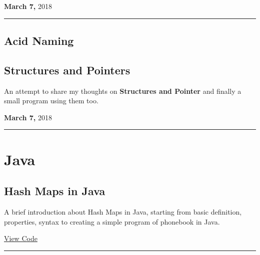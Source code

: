 \documentclass[11pt]{article}
\begin{document}
\textbf{March 7,} 2018

\noindent\rule{\textwidth}{0.5pt}

\subsection{Acid Naming}
\label{sec:org6a72935}

\subsection{Structures and Pointers}
\label{sec:org4056c38}
An attempt to share my thoughts on \textbf{Structures and Pointer} and finally a small
program using them too.

\textbf{March 7,} 2018

\noindent\rule{\textwidth}{0.5pt}
\section{Java}
\label{sec:org46338e2}
\subsection{Hash Maps in Java}
\label{sec:org58b3341}
A brief introduction about Hash Maps in Java, starting from basic definition,
properties, syntax to creating a simple program of phonebook in Java.

\href{https://github.com/imahajanshubham/Miscellaneous-Programs/blob/master/c\_lang/problem16/suffixprefixsum.c}{View Code}

\noindent\rule{\textwidth}{0.5pt}
\end{document}
